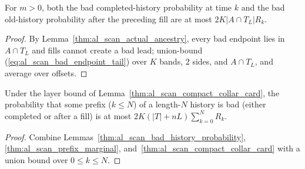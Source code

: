 \begin{lemma}
    \label{thm:al_scan_bad_history_probability}
    \leanok
    For $m>0$, both the bad completed-history probability at time $k$ and the bad old-history probability after the preceding fill are at most $2K|A\cap T_L|R_k$.
\end{lemma}
\begin{proof}\leanok
    By Lemma~\ref{thm:al_scan_actual_ancestry}, every bad endpoint lies in $A\cap T_L$ and fills cannot create a bad lead; union-bound (\ref{eq:al_scan_bad_endpoint_tail}) over $K$ bands, $2$ sides, and $A\cap T_L$, and average over offsets.
\end{proof}

\begin{lemma}
    \label{thm:al_scan_bad_all_times}
    \leanok
    Under the layer bound of Lemma~\ref{thm:al_scan_compact_collar_card}, the probability that some prefix ($k\le N$) of a length-$N$ history is bad (either completed or after a fill) is at most
    $2K(|T|+nL)\sum_{k=0}^N R_k$.
\end{lemma}
\begin{proof}\leanok
    Combine Lemmas~\ref{thm:al_scan_bad_history_probability}, \ref{thm:al_scan_prefix_marginal}, and~\ref{thm:al_scan_compact_collar_card} with a union bound over $0\le k\le N$.
\end{proof}

